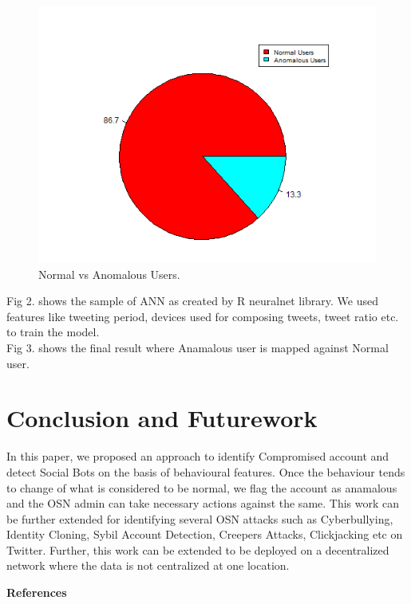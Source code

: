 \documentclass[conference]{IEEEtran}
\begin{document}
\begin{figure}[h!]
  \includegraphics[scale=0.6]{pieChart1}
  \caption{ Normal vs Anomalous Users.}
\end{figure}

Fig 2. shows the sample of ANN as created by R neuralnet library. We used features like tweeting period, devices used for composing tweets, tweet ratio etc. to train the model.\\
Fig 3. shows the final result where Anamalous user is mapped against Normal user.

\section{Conclusion and Futurework}

In this paper, we proposed an approach to identify Compromised account and detect Social Bots on the basis of behavioural features. Once the behaviour tends to change of what is considered to be normal, we flag the account as anamalous and the OSN admin can take necessary actions against the same. This work can be further extended for identifying several OSN attacks such as Cyberbullying, Identity Cloning, Sybil Account Detection, Creepers Attacks, Clickjacking etc on Twitter. Further, this work can be extended to be deployed on a decentralized network where the data is not centralized at one location.

\begin{center}
\textbf{References}
\end{center}
\end{document}
